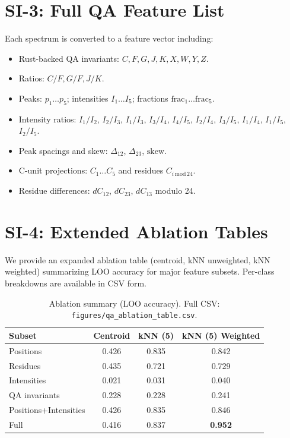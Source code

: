 \documentclass[12pt]{article}
\begin{document}
\section*{SI-3: Full QA Feature List}
Each spectrum is converted to a feature vector including:
\begin{itemize}
  \item Rust-backed QA invariants: $C,F,G,J,K,X,W,Y,Z$.
  \item Ratios: $C/F, G/F, J/K$.
  \item Peaks: $p_1\ldots p_5$; intensities $I_1\ldots I_5$; fractions $\mathrm{frac}_1\ldots\mathrm{frac}_5$.
  \item Intensity ratios: $I_1/I_2$, $I_2/I_3$, $I_1/I_3$, $I_3/I_4$, $I_4/I_5$, $I_2/I_4$, $I_3/I_5$, $I_1/I_4$, $I_1/I_5$, $I_2/I_5$.
  \item Peak spacings and skew: $\Delta_{12}$, $\Delta_{23}$, $\mathrm{skew}$.
  \item C-unit projections: $C_1\ldots C_5$ and residues $C_{i\,\mathrm{mod}\,24}$.
  \item Residue differences: $dC_{12}$, $dC_{23}$, $dC_{13}$ modulo 24.
\end{itemize}

\section*{SI-4: Extended Ablation Tables}
We provide an expanded ablation table (centroid, kNN unweighted, kNN weighted) summarizing LOO accuracy for major feature subsets. Per-class breakdowns are available in CSV form.

\begin{table}[H]
\centering
\caption{Ablation summary (LOO accuracy). Full CSV: \texttt{figures/qa\_ablation\_table.csv}.}
\begin{tabular}{lccc}
\toprule
Subset & Centroid & kNN (5) & kNN (5) Weighted \\
\midrule
Positions & 0.426 & 0.835 & 0.842 \\
Residues & 0.435 & 0.721 & 0.729 \\
Intensities & 0.021 & 0.031 & 0.040 \\
QA invariants & 0.228 & 0.228 & 0.241 \\
Positions+Intensities & 0.426 & 0.835 & 0.846 \\
Full & 0.416 & 0.837 & \textbf{0.952} \\
\bottomrule
\end{tabular}
\end{table}
\end{document}

